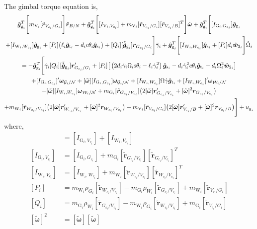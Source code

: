 The gimbal torque equation is,
\begin{multline}
\hat{\bm g}_{\text{g}_i}^T \Bigg[ m_{\text{V}_i}[\tilde{\bm r}_{V_{c_i}/G_i}] \Bigg] \ddot{\bm r}_{B/N}
+ \hat{\bm g}_{\text{g}_i}^T \Bigg[ [I_{\text{V}_i,V_{c_i}}] + m_{\text{V}_i}[\tilde{\bm r}_{V_{c_i}/G_i}][\tilde{\bm{r}}_{V_{c_i}/B}]^T \Bigg] \dot{\bm{\omega}}
+ \hat{\bm g}_{\text{g}_i}^T \Bigg[ [I_{\text{G}_i,G_{c_i}}]\hat{\bm{g}}_{\text{g}_i} \\+ [I_{\text{W}_i,W_{c_i}}]\hat{\bm{g}}_{\text{g}_i} + [P_i] \big(\ell_i\hat{\bm{g}}_{\text{t}_i} - d_ic\theta_i\hat{\bm{g}}_{\text{s}_i}\big) + [Q_i] [\tilde{\hat{\bm g}}_{\text{g}_i}]\bm{r}_{G_{c_i}/G_i} \Bigg] \ddot{\gamma}_i
+ \hat{\bm g}_{\text{g}_i}^T \Bigg[ [I_{\text{W}_i,W_{c_i}}]\hat{\bm{g}}_{\text{s}_i} + [P_i] d_i\hat{\bm w}_{3_i} \Bigg] \dot{\Omega}_i
\\ = - \hat{\bm g}_{\text{g}_i}^T \Bigg[ \dot{\gamma}_i[Q_i][\tilde{\hat{\bm g}}_{\text{g}_i}]\bm{r}'_{G_{c_i}/G_i} + [P_i] \big[\left(2d_i\dot{\gamma}_i\Omega_i\text{s}\theta_i - \ell_i\dot{\gamma}_i^2\right)\hat{\bm{g}}_{\text{s}_i} - d_i\dot{\gamma}_i^2c\theta_i\hat{\bm{g}}_{\text{t}_i} - d_i\Omega_i^2 \hat{\bm{w}}_{2_i}\big]
\\+[I_{\text{G}_i,G_{c_i}}]'\bm\omega_{\mathcal{G}_i/\cal N} + [\tilde{\bm\omega}][I_{\text{G}_i,G_{c_i}}]\bm\omega_{\mathcal{G}_i/\cal N} + [I_{\text{W}_i,W_{c_i}}]\Omega\dot{\gamma}\hat{\bm{g}}_{\text{t}_i} + [I_{\text{W}_i,W_{c_i}}]'\bm\omega_{\mathcal{W}_i/\cal N} \\+ [\tilde{\bm{\omega}}][I_{\text{W}_i,W_{c_i}}]\bm\omega_{\mathcal{W}_i/\cal N}
+ m_{\text{G}_i}[\tilde{\bm{r}}_{G_{c_i}/V_{c_i}}] \big( 2[\tilde{\bm\omega}]\bm{r}'_{G_{c_i}/V_{c_i}} + [\tilde{\bm\omega}]^2\bm{r}_{G_{c_i}/V_{c_i}}\big)
\\ + m_{\text{W}_i}[\tilde{\bm{r}}_{W_{c_i}/V_{c_i}}]\big( 2[\tilde{\bm\omega}]\bm{r}'_{W_{c_i}/V_{c_i}} + [\tilde{\bm\omega}]^2\bm{r}_{W_{c_i}/V_{c_i}}\big)
+ m_{\text{V}_i}[\tilde{\bm r}_{V_{c_i}/G_i}]\big( 2[\tilde{\bm\omega}]\bm{r}'_{V_{c_i}/B} + [\tilde{\bm\omega}]^2\bm{r}_{V_{c_i}/B} \big) \Bigg] + u_{\text{g}_i}
\label{eq:vscmgtorque}
\end{multline} 
where,
\begin{align}
[I_{\text{V}_i,V_{c_i}}] &= [I_{\text{G}_i,V_{c_i}}] + [I_{\text{W}_i,V_{c_i}}]
\\
[I_{\text{G}_i,V_{c_i}}] &= [I_{\text{G}_i,G_{c_i}}] + m_{\text{G}_i}[\tilde{\bm{r}}_{G_{c_i}/V_{c_i}}][\tilde{\bm{r}}_{G_{c_i}/V_{c_i}}]^T
\\
[I_{\text{W}_i,V_{c_i}}] &= [I_{\text{W}_i,W_{c_i}}] + m_{\text{W}_i}[\tilde{\bm{r}}_{W_{c_i}/V_{c_i}}][\tilde{\bm{r}}_{W_{c_i}/V_{c_i}}]^T
\\
[P_i] &= m_{\text{W}_i}\rho_{G_i}[\tilde{\bm{r}}_{W_{c_i}/V_{c_i}}] - m_{\text{G}_i}\rho_{W_i}[\tilde{\bm{r}}_{G_{c_i}/V_{c_i}}] + m_{\text{W}_i}[\tilde{\bm r}_{V_{c_i}/G_i}]
\\
[Q_i] &= m_{\text{G}_i}\rho_{W_i}[\tilde{\bm{r}}_{G_{c_i}/V_{c_i}}] - m_{\text{W}_i}\rho_{G_i}[\tilde{\bm{r}}_{W_{c_i}/V_{c_i}}] + m_{\text{G}_i}[\tilde{\bm r}_{V_{c_i}/G_i}]
\\
[\tilde{\bm\omega}]^2 &= [\tilde{\bm\omega}][\tilde{\bm\omega}]
\end{align}


